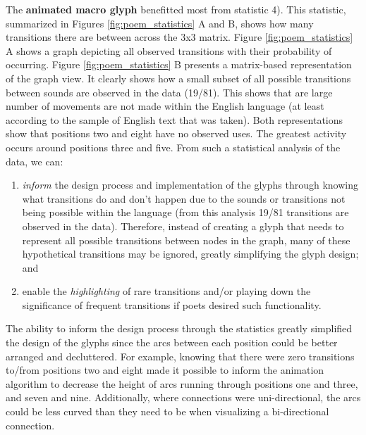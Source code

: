 The \textbf{animated macro glyph} benefitted most from statistic 4). 
This statistic, summarized in Figures \ref{fig:poem_statistics} A and B, shows how many transitions there are between across the 3x3 matrix. 
Figure \ref{fig:poem_statistics} A shows a graph depicting all observed transitions with their probability of occurring. Figure \ref{fig:poem_statistics} B presents a matrix-based representation of the graph view. 
It clearly shows how a small subset of all possible transitions between sounds are observed in the data (19/81).
This shows that are large number of movements are not made within the English language (at least according to the sample of English text that was taken). 
Both representations show that positions two and eight have no observed uses.
The greatest activity occurs around positions three and five. 
From such a statistical analysis of the data, we can:
\begin{enumerate}
\item \emph{inform} the design process and implementation of the glyphs through knowing what transitions do and don't happen due to the sounds or transitions not being possible within the language (from this analysis 19/81 transitions are observed in the data). Therefore, instead of creating a glyph that needs to represent all possible transitions between nodes in the graph, many of these hypothetical transitions may be ignored, greatly simplifying the glyph design; and
\item enable the \emph{highlighting} of rare transitions and/or playing down the significance of frequent transitions if poets desired such functionality.
\end{enumerate}

The ability to inform the design process through the statistics greatly simplified the design of the glyphs since the arcs between each position could be better arranged and decluttered.
For example, knowing that there were zero transitions to/from positions two and eight made it possible to inform the animation algorithm to decrease the height of arcs running through positions one and three, and seven and nine. 
Additionally, where connections were uni-directional, the arcs could be less curved than they need to be when visualizing a bi-directional connection. 

